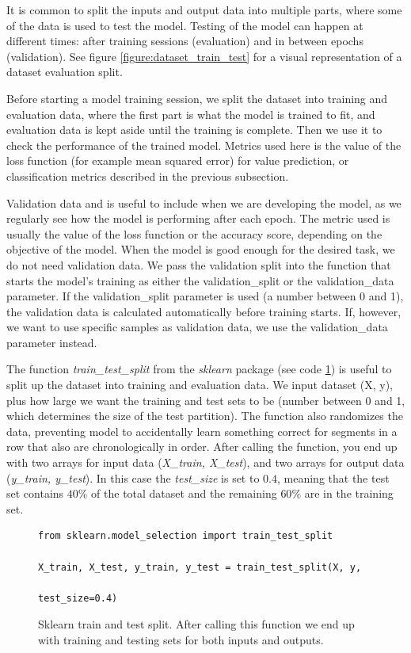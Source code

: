 It is common to split the inputs and output data into multiple parts, where some of the data is used to test the model. Testing of the model can happen at different times: after training sessions (evaluation) and in between epochs (validation). See figure \ref{figure:dataset_train_test} for a visual representation of a dataset evaluation split.

Before starting a model training session, we split the dataset into training and evaluation data, where the first part is what the model is trained to fit, and evaluation data is kept aside until the training is complete. Then we use it to check the performance of the trained model. Metrics used here is the value of the loss function (for example mean squared error) for value prediction, or classification metrics described in the previous subsection.

Validation data and is useful to include when we are developing the model, as we regularly see how the model is performing after each epoch. The metric used is usually the value of the loss function or the accuracy score, depending on the objective of the model. When the model is good enough for the desired task, we do not need validation data. We pass the validation split into the function that starts the model's training as either the validation\_split or the validation\_data parameter. If the validation\_split parameter is used (a number between 0 and 1), the validation data is calculated automatically before training starts. If, however, we want to use specific samples as validation data, we use the validation\_data parameter instead.

The function \textit{train\_test\_split} from the \textit{sklearn} package (see code \ref{code:sklearn_train_test_split}) is useful to split up the dataset into training and evaluation data. We input dataset (X, y), plus how large we want the training and test sets to be (number between 0 and 1, which determines the size of the test partition). The function also randomizes the data, preventing model to accidentally learn something correct for segments in a row that also are chronologically in order. After calling the function, you end up with two arrays for input data (\textit{X\_train, X\_test}), and two arrays for output data (\textit{y\_train, y\_test}). In this case the \textit{test\_size} is set to $0.4$, meaning that the test set contains $40\%$ of the total dataset and the remaining $60\%$ are in the training set.

\begin{figure}[h]
\begin{code}
    \begin{verbatim}
from sklearn.model_selection import train_test_split

X_train, X_test, y_train, y_test = train_test_split(X, y, 
                                                    test_size=0.4)
    \end{verbatim}
    \caption{Sklearn train and test split. After calling this function we end up with training and testing sets for both inputs and outputs.}
    \label{code:sklearn_train_test_split}
\end{code}
\end{figure}

